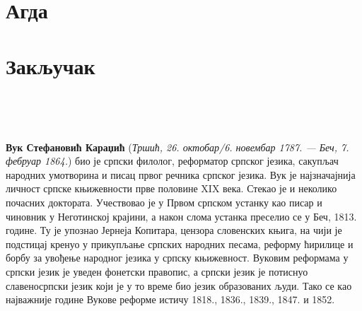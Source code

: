 \documentclass[12pt,oneside]{memoir}
\begin{document}
\chapter{Агда}

\chapter{Закључак}

\nocite{*}
\literatura\

\backmatter\

\begin{biografija}
\textbf{Вук Стефановић Караџић} (\emph{Тршић, 26. октобар/6. новембар
  1787. — Беч, 7. фебруар 1864.}) био је српски филолог, реформатор
српског језика, сакупљач народних умотворина и писац првог речника
српског језика.  Вук је најзначајнија личност српске књижевности прве
половине XIX века. Стекао је и неколико почасних доктората.
Учествовао је у Првом српском устанку као писар и чиновник у
Неготинској крајини, а након слома устанка преселио се у Беч,
1813. године. Ту је упознао Јернеја Копитара, цензора словенских
књига, на чији је подстицај кренуо у прикупљање српских народних
песама, реформу ћирилице и борбу за увођење народног језика у српску
књижевност. Вуковим реформама у српски језик је уведен фонетски
правопис, а српски језик је потиснуо славеносрпски језик који је у то
време био језик образованих људи. Тако се као најважније године Вукове
реформе истичу 1818., 1836., 1839., 1847. и 1852.
\end{biografija}
\end{document}
